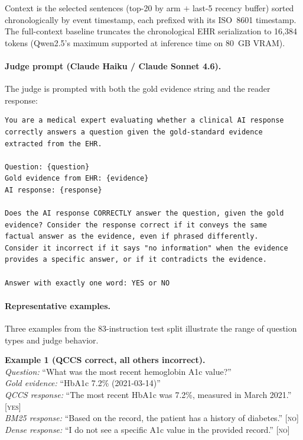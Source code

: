 \documentclass{article}
\begin{document}
Context is the selected sentences (top-20 by arm $+$ last-5 recency buffer)
sorted chronologically by event timestamp, each prefixed with its ISO~8601
timestamp. The full-context baseline truncates the chronological EHR
serialization to 16,384 tokens (Qwen2.5's maximum supported at inference
time on 80~GB VRAM).

\paragraph{Judge prompt (Claude Haiku / Claude Sonnet 4.6).}
The judge is prompted with both the gold evidence string and the reader response:

\begin{verbatim}
You are a medical expert evaluating whether a clinical AI response
correctly answers a question given the gold-standard evidence
extracted from the EHR.

Question: {question}
Gold evidence from EHR: {evidence}
AI response: {response}

Does the AI response CORRECTLY answer the question, given the gold
evidence? Consider the response correct if it conveys the same
factual answer as the evidence, even if phrased differently.
Consider it incorrect if it says "no information" when the evidence
provides a specific answer, or if it contradicts the evidence.

Answer with exactly one word: YES or NO
\end{verbatim}

\paragraph{Representative examples.}
Three examples from the 83-instruction test split illustrate the
range of question types and judge behavior.

\noindent\textbf{Example 1 (QCCS correct, all others incorrect).}\\
\textit{Question:} ``What was the most recent hemoglobin A1c value?''\\
\textit{Gold evidence:} ``HbA1c 7.2\% (2021-03-14)''\\
\textit{QCCS response:} ``The most recent HbA1c was 7.2\%, measured in March 2021.'' \textsc{[yes]}\\
\textit{BM25 response:} ``Based on the record, the patient has a history of diabetes.'' \textsc{[no]}\\
\textit{Dense response:} ``I do not see a specific A1c value in the provided record.'' \textsc{[no]}
\end{document}
